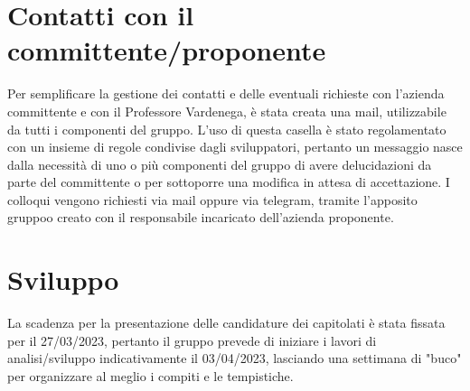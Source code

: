 \documentclass[12pt]{article}
\begin{document}
\section{Contatti con il committente/proponente}
Per semplificare la gestione dei contatti e delle eventuali richieste con l'azienda committente e con il Professore Vardenega, è stata creata una mail, \href{swellfish14@gmail.com}{} utilizzabile da tutti i componenti del gruppo.
L'uso di questa casella è stato regolamentato con un insieme di regole condivise dagli sviluppatori, pertanto un messaggio nasce dalla necessità di uno o più componenti del gruppo di avere delucidazioni da parte del committente o per sottoporre una modifica in attesa di accettazione.
I colloqui vengono richiesti via mail oppure via telegram, tramite l'apposito gruppoo creato con il responsabile incaricato dell'azienda proponente.

\section{Sviluppo}
La scadenza per la presentazione delle candidature dei capitolati è stata fissata per il 27/03/2023, pertanto il gruppo prevede di iniziare i lavori di analisi/sviluppo indicativamente il 03/04/2023, lasciando una settimana di "buco" per organizzare al meglio i compiti e le tempistiche.
\end{document}
